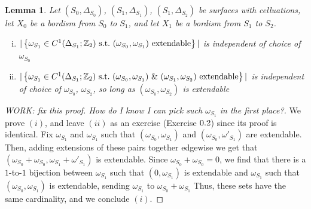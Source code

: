 \documentclass{article}
\newtheorem{lemma}{Lemma}[section]
\theoremstyle{definition}
\numberwithin{figure}{section}
\begin{document}
\begin{lemma}\label{independence} Let $(S_0,\Delta_{S_0})$, $(S_1,\Delta_{S_1})$, $(S_1,\Delta_{S_2})$ be surfaces with celluations, let $X_0$ be a bordism from $S_0$ to $S_1$, and let $X_1$ be a bordism from $S_1$ to $S_2$.

\begin{enumerate}[(i)]
\item $|\left\{\omega_{S_1}\in C^1(\Delta_{S_1};\mathbb{Z}_2) \,\,\mathrm{s.t.}\,\, (\omega_{S_0},\omega_{S_1}) \text{ extendable}\right\}|$ is independent of choice of $\omega_{S_0}$
\item $|\left\{\omega_{S_1}\in C^1(\Delta_{S_1};\mathbb{Z}_2)\,\,\mathrm{s.t.}\,\, (\omega_{S_0},\omega_{S_1})\,\, \& \,\,(\omega_{S_1},\omega_{S_2})\text{ extendable}\right\}|$ is independent of choice of $\omega_{S_0}$, $\omega_{S_2}$, so long as $(\omega_{S_0},\omega_{S_2})$ is extendable
\end{enumerate}
\end{lemma}
\begin{proof} [WORK: fix this proof. How do I know I can pick such $\omega_{S_1}$ in the first place?] We prove $(i)$, and leave $(ii)$ as an exercise (Exercise $\thesection.2$) since its proof is identical. Fix $\omega_{S_1}$ and $\omega_{S_1}$ such that $(\omega_{S_0},\omega_{S_1})$ and $(\omega_{S_0},\omega'_{S_1})$ are extendable. Then, adding extensions of these pairs together edgewise we get that $(\omega_{S_0}+\omega_{S_0},\omega_{S_1}+\omega'_{S_1})$ is extendable. Since $\omega_{S_0}+\omega_{S_0}=0$, we find that there is a $1$-to-$1$ bijection between $\omega_{S_1}$ such that $(0,\omega_{S_1})$ is extendable and $\omega_{S_1}$ such that $(\omega_{S_0},\omega_{S_1})$ is extendable, sending $\omega_{S_1}$ to $\omega_{S_0}+\omega_{S_1}$ Thus, these sets have the same cardinality, and we conclude $(i)$.
\end{proof}
\end{document}
